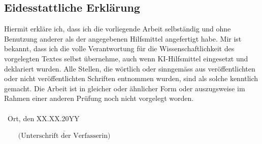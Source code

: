 \documentclass[11pt,a4paper,titlepage]{scrartcl}
\begin{document}
\subsection*{Eidesstattliche Erklärung}
Hiermit erkläre ich, dass ich die vorliegende Arbeit selbständig und ohne Benutzung anderer als der angegebenen Hilfsmittel angefertigt habe. Mir ist bekannt, dass ich die volle Verantwortung für die Wissenschaftlichkeit des vorgelegten Textes selbst übernehme, auch wenn KI-Hilfsmittel eingesetzt und deklariert wurden. Alle Stellen, die wörtlich oder sinngemäss aus veröffentlichten oder nicht veröffentlichten Schriften entnommen wurden, sind als solche kenntlich gemacht. Die Arbeit ist in gleicher oder ähnlicher Form oder auszugsweise im Rahmen einer anderen Prüfung noch nicht vorgelegt worden.\\\\\
\noindent Ort, den XX.XX.20YY
\begin{flushright}
$\overline{~~~~~~~~~\mbox{(Unterschrift der Verfasserin)}~~~~~~~~~}$
\end{flushright}
\end{document}
